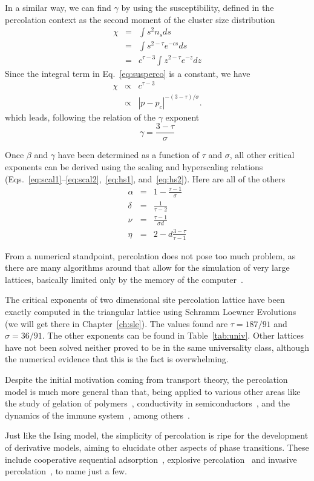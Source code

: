 In a similar way, we can find $\gamma$ by using the susceptibility, defined in
the percolation context as the second moment of the cluster size distribution
\begin{eqnarray}
    \chi & = & \int s^{2}n_{s}ds\\
      & = & \int s^{2-\tau}e^{-cs}ds\\
      & = & c^{\tau-3}\int z^{2-\tau}e^{-z}dz
    \label{eq:susperco}
\end{eqnarray}
Since the integral term in Eq.~\ref{eq:susperco} is a constant, we have
\begin{eqnarray}
    \chi & \propto & c^{\tau-3}\\
 & \propto & \left|p-p_{c}\right|^{-\left(3-\tau\right)/\sigma}.
\end{eqnarray}
which leads, following the relation of the $\gamma$ exponent
\begin{equation}
    \gamma=\frac{3-\tau}{\sigma}
\end{equation}


Once $\beta$ and $\gamma$ have been determined as a function of $\tau$ and
$\sigma$, all other critical exponents can be derived using the scaling
and hyperscaling relations (Eqs.~\ref{eq:scal1}--\ref{eq:scal2},~\ref{eq:hs1},
and~\ref{eq:hs2}). Here
are all of the others
\begin{eqnarray}
    \alpha & = & 1-\frac{\tau-1}{\sigma}\\
    \delta & = & \frac{1}{\tau-2}\\
    \nu    & = & \frac{\tau-1}{\sigma d}\\
    \eta   & = & 2-d\frac{3-\tau}{\tau-1}
\end{eqnarray}

From a numerical standpoint, percolation does not pose too much problem, as
there are many algorithms around that allow for the simulation of very large
lattices, basically limited only by the memory of the
computer~\cite{Newman2000}.

The critical exponents of two dimensional site percolation lattice have been
exactly computed in the triangular lattice using Schramm Loewner
Evolutions~\cite{Smirnov2001} (we will get there in Chapter~\ref{ch:sle}). The
values found are $\tau=187/91$ and $\sigma=36/91$. The other exponents can be
found in Table~\ref{tab:univ}. Other lattices have not been solved neither
proved to be in the same universality class, although the numerical evidence
that this is the fact is overwhelming.

Despite the initial motivation coming from transport theory, the percolation
model is much more general than that, being applied to various other areas like
the study of gelation of polymers~\cite{DeCandia2005}, conductivity in
semiconductors~\cite{Ambegaokar1971}, and the dynamics of the immune
system~\cite{Stewart1991}, among others~\cite{Sahimi1994}.

Just like the Ising model, the simplicity of percolation is ripe for the
development of derivative models, aiming to elucidate other aspects of phase
transitions. These include cooperative sequential adsorption~\cite{Araujo2013},
explosive percolation~\cite{Achlioptas2009} and invasive
percolation~\cite{Wilkinson1983}, to name just a few.


